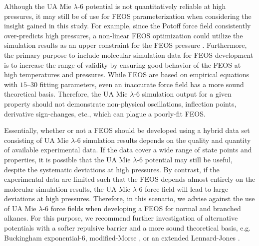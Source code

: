 \documentclass[preprint,letterpaper,floatfix,citeautoscript,aip,jcp]{revtex4-1}
\begin{document}
Although the UA Mie $\lambda$-6 potential is not quantitatively reliable at high pressures, it may still be of use for FEOS parameterization when considering the insight gained in this study. For example, since the Potoff force field consistently over-predicts high pressures, a non-linear FEOS optimization could utilize the simulation results as an upper constraint for the FEOS pressure \cite{Thol_LJTS}. Furthermore, the primary purpose to include molecular simulation data for FEOS development is to increase the range of validity by ensuring good behavior of the FEOS at high temperatures and pressures. While FEOS are based on empirical equations with $15$--$30$ fitting parameters, even an inaccurate force field has a more sound theoretical basis. Therefore, the UA Mie $\lambda$-6 simulation output for a given property should not demonstrate non-physical oscillations, inflection points, derivative sign-changes, etc., which can plague a poorly-fit FEOS.

%
%
%
%


Essentially, whether or not a FEOS should be developed using a hybrid data set consisting of UA Mie $\lambda$-6 simulation results depends on the quality and quantity of available experimental data. If the data cover a wide range of state points and properties, it is possible that the UA Mie $\lambda$-6 potential may still be useful, despite the systematic deviations at high pressures. By contrast, if the experimental data are limited such that the FEOS depends almost entirely on the molecular simulation results, the UA Mie $\lambda$-6 force field will lead to large deviations at high pressures. Therefore, in this scenario, we advise against the use of UA Mie $\lambda$-6 force fields when developing a FEOS for normal and branched alkanes. For this purpose, 
we recommend further investigation of alternative potentials with a softer repulsive barrier and a more sound theoretical basis, e.g. Buckingham exponential-6, modified-Morse \cite{Rowley1999,Rowley2001,Hayes2004}, or an extended Lennard-Jones \cite{Mostafa_Diss,Hajigeorgiou2016,Kalos1972}.
\end{document}
